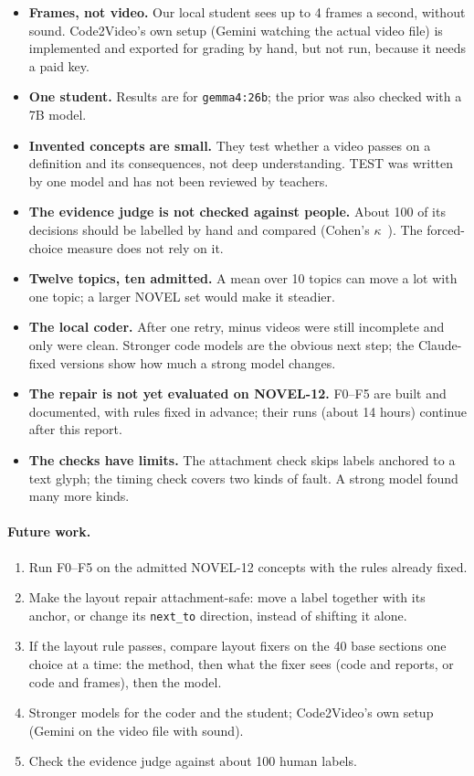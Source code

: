 \documentclass[11pt]{article}
\begin{document}
\begin{itemize}
  \item \textbf{Frames, not video.} Our local student sees up to 4 frames a second, without sound. Code2Video's own
  setup (Gemini watching the actual video file) is implemented and exported for grading by hand, but not run, because
  it needs a paid key.
  \item \textbf{One student.} Results are for \texttt{gemma4:26b}; the prior was also checked with a 7B model.
  \item \textbf{Invented concepts are small.} They test whether a video passes on a definition and its consequences,
  not deep understanding. TEST was written by one model and has not been reviewed by teachers.
  \item \textbf{The evidence judge is not checked against people.} About 100 of its decisions should be labelled by
  hand and compared (Cohen's $\kappa$~\cite{cohen1960}). The forced-choice measure does not rely on it.
  \item \textbf{Twelve topics, ten admitted.} A mean over 10 topics can move a lot with one topic; a larger NOVEL set
  would make it steadier.
  \item \textbf{The local coder.} After one retry, \AdmTotal{} minus \AdmComplete{} videos were still incomplete and
  only \AdmClean{} were clean. Stronger code models are the obvious next step; the Claude-fixed versions show how much a
  strong model changes.
  \item \textbf{The repair is not yet evaluated on NOVEL-12.} F0--F5 are built and documented, with rules fixed in advance; their
  runs (about 14 hours) continue after this report.
  \item \textbf{The checks have limits.} The attachment check skips labels anchored to a text glyph; the timing check
  covers two kinds of fault. A strong model found many more kinds.
\end{itemize}

\paragraph{Future work.}
\begin{enumerate}
  \item Run F0--F5 on the admitted NOVEL-12 concepts with the rules already fixed.
  \item Make the layout repair attachment-safe: move a label together with its anchor, or change its
  \texttt{next\_to} direction, instead of shifting it alone.
  \item If the layout rule passes, compare layout fixers on the 40 base sections one choice at a time: the method,
  then what the fixer sees (code and reports, or code and frames), then the model.
  \item Stronger models for the coder and the student; Code2Video's own setup (Gemini on the video file with sound).
  \item Check the evidence judge against about 100 human labels.
\end{enumerate}
\end{document}
